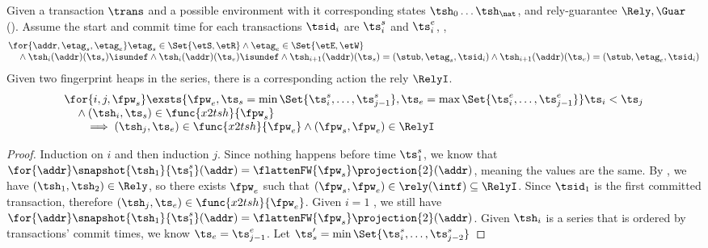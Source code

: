 \begin{lem}
Given a transaction \( \trans \) and a possible environment with it corresponding states \( \tsh_{0} \dots \tsh_{\nat} \), and rely-guarantee \( \Rely, \Guar \) ().
Assume the start and commit time for each transactions \( \tsid_{i} \) are \( \ts_{i}^{s} \) and \( \ts_{i}^{e}\), \ie,
\[
\begin{array}{@{}l@{}}
    \for{ \addr, \etag_{s}, \etag_{e} }
    \etag_{s} \in \Set{\etS, \etR}
    \land \etag_{e} \in \Set{\etE, \etW} \\
    \quad {} \land \tsh_{i}(\addr)(\ts_{s}) \isundef
    \land \tsh_{i}(\addr)(\ts_{e}) \isundef
    \land \tsh_{i + 1}(\addr)(\ts_{s}) = (\stub,\etag_{s}, \tsid_{i}) 
    \land \tsh_{i + 1}(\addr)(\ts_{e}) = (\stub,\etag_{e}, \tsid_{i}) 
\end{array}
\]
Given two fingerprint heaps in the series, there is a corresponding action the rely \( \RelyI \).
\[
    \begin{array}{@{}l@{}}
    \for{i,j, \fpw_{s}}
    \exsts{\fpw_{e}, \ts_{s} = \min\Set{\ts_{i}^{s}, \dots, \ts_{j - 1}^{s}}, \ts_{e} = \max\Set{\ts_{i}^{e}, \dots, \ts_{j-1}^{e}}} 
    \ts_{i} < \ts_{j} \\
    \quad {} \land (\tsh_{i}, \ts_{s}) \in \func{x2tsh}{\fpw_{s}} \\
    \qquad \implies (\tsh_{j}, \ts_{e}) \in \func{x2tsh}{\fpw_{e}}
    \land (\fpw_{s}, \fpw_{e}) \in \RelyI 
    \end{array}
\]
\end{lem}
\begin{proof}
Induction on \( i \) and then induction \( j \).
Since nothing happens before  time \( \ts_{1}^{s} \), we know that \( \for{\addr} \snapshot{\tsh_{1}}{ \ts_{1}^{s}}(\addr) =  \flattenFW{\fpw_{s}}\projection{2}(\addr) \), meaning the values are the same.
By , we have \( ( \tsh_{1}, \tsh_{2}) \in \Rely \), so there exists \( \fpw_{e} \) such that \( (\fpw_{s}, \fpw_{e}) \in \rely(\intf) \subseteq \RelyI\).
Since \( \tsid_{1} \) is the first committed transaction, therefore \( (\tsh_{j}, \ts_{e}) \in \func{x2tsh}{\fpw_{e}}\).
Given \( i = 1 \) , we still have \( \for{\addr} \snapshot{\tsh_{1}}{ \ts_{1}^{s}}(\addr) =  \flattenFW{\fpw_{s}}\projection{2}(\addr) \).
Given \( \tsh_{i} \) is a series that is ordered by transactions' commit times, we know \( \ts_{e} = \ts_{j-1}^{e} \).
Let \(  \ts_{s}' = \min\Set{\ts_{i}^{s}, \dots, \ts_{j - 2}^{s}} \)

\end{proof}

